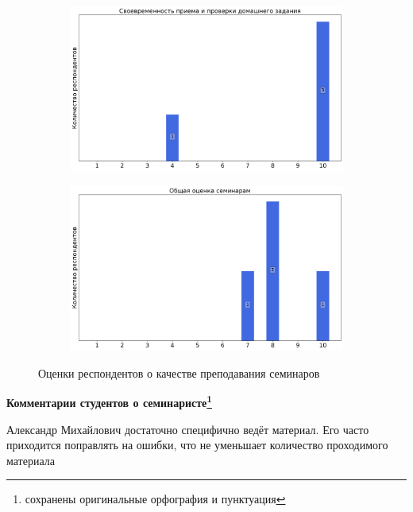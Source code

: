 \begin{figure}[H]
\begin{subfigure}[b]{0.45\textwidth}
				\includegraphics[width=\textwidth]{images/2 course/Кратные интегралы и теория поля/seminarists-marks-Бишаев А.М.-2.png}
			\end{subfigure}
			\begin{subfigure}[b]{0.45\textwidth}
				\centering
				\includegraphics[width=\textwidth]{images/2 course/Кратные интегралы и теория поля/seminarists-marks-Бишаев А.М.-3.png}
			\end{subfigure}	
			\caption{Оценки респондентов о качестве преподавания семинаров}
		\end{figure}

		\textbf{Комментарии студентов о семинаристе\protect\footnote{сохранены оригинальные орфография и пунктуация}}
            \begin{commentbox} 
                Александр Михайлович достаточно специфично ведёт материал. Его часто приходится поправлять на ошибки, что не уменьшает количество проходимого материала  
            \end{commentbox} 
        
